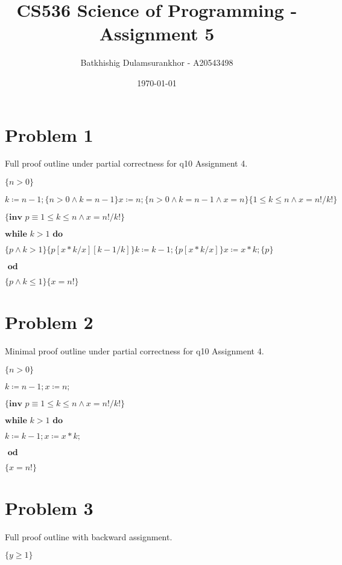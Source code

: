 \documentclass{article}
\title{CS536 Science of Programming - Assignment 5}
\author{Batkhishig Dulamsurankhor - A20543498}
\date{\today} %
\begin{document}
\maketitle


\section*{Problem 1}

Full proof outline under partial correctness for q10 Assignment 4.
\vspace{10pt}

$\{n>0\}$

$k \coloneqq n-1; \{n>0 \wedge k=n-1\} x \coloneqq n; \{n>0 \wedge k=n-1 \wedge x=n\}\{1 \leq k \leq n \wedge x=n!/k! \}$

$\{\textbf{inv }p \equiv 1 \leq k \leq n \wedge x=n!/k! \}$

$ \textbf{while } k>1 \textbf{ do }$

\qquad \qquad $\{p \wedge k>1\}\{p[x*k/x][k-1/k]\}k \coloneqq k-1; \{p[x*k/x]\}x \coloneqq x*k; \{p\}$

$\textbf{ od}$

$\{p \wedge k \leq 1\}\{x=n!\}$


\section*{Problem 2}

Minimal proof outline under partial correctness for q10 Assignment 4.
\vspace{10pt}

$\{n>0\}$

$k \coloneqq n-1; x \coloneqq n;$

$\{\textbf{inv }p \equiv 1 \leq k \leq n \wedge x=n!/k! \}$

$ \textbf{while } k>1 \textbf{ do }$

\qquad \qquad $k \coloneqq k-1; x \coloneqq x*k;$

$\textbf{ od}$

$\{x=n!\}$


\section*{Problem 3}

Full proof outline with backward assignment.

\vspace{10pt}

$ \{y \geq 1\} $
\end{document}
